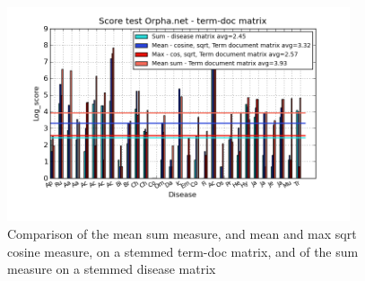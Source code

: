 \begin{figure}[H]
        \begin{center}
          \includegraphics[width=0.9\textwidth]{barcharts/termDoc_orphan_hist_3000_sum_dm_mea_cos_sqrt_td_max_cos_sqrt_td_mea_sum_nn_td.png}
        \end{center}
        \caption{Comparison of the mean sum measure, and mean and max sqrt cosine measure, on a stemmed term-doc matrix, and of the sum measure on a stemmed disease matrix}
        \label{termDoc_orphan_hist_3000_sum_dm_mea_cos_sqrt_td_max_cos_sqrt_td_mea_sum_nn_td}
\end{figure}

